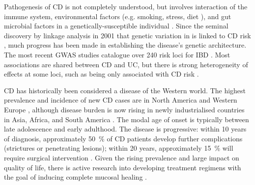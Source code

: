 Pathogenesis of \gls{CD} is not completely understood, but involves interaction of the immune system, environmental factors (e.g. smoking, stress, diet \autocite{ananthakrishnan2015EpidemiologyRiskFactors,roda2020CrohnDisease}), and gut microbial factors in a genetically-susceptible individual \autocite{desouza2016ImmunopathogenesisIBDCurrent}.
Since the seminal discovery by linkage analysis in 2001 that genetic variation in  is linked to \gls{CD} risk \autocite{todd2001TacklingCommonDisease},
much progress has been made in establishing the disease's genetic architecture.
The most recent \gls{GWAS} studies catalogue over 240 risk loci for \gls{IBD} \autocite{delange2017GenomewideAssociationStudy}.
Most associations are shared between \gls{CD} and \gls{UC}, but there is strong heterogeneity of effects at some loci, such as  being only associated with \gls{CD} risk \autocite{jostins2012HostMicrobeInteractions,liu2015AssociationAnalysesIdentify}.

\gls{CD} has historically been considered a disease of the Western world.
The highest prevalence and incidence of new \gls{CD} cases are in North America and Western Europe \autocite{roda2020CrohnDisease},
although disease burden is now rising in newly industrialised countries in Asia, Africa, and South America \autocite{kaplan2015GlobalBurdenIBD,alatab2020GlobalRegionalNational}.
The modal age of onset is typically between late adolescence and early adulthood.
The disease is progressive:
within 10 years of diagnosis, approximately \SI{50}{\percent} of \gls{CD} patients develop further complications (strictures or penetrating lesions); within 20 years, approximately \SI{15}{\percent} will require surgical intervention \autocite{roda2020CrohnDisease}.
Given the rising prevalence and large impact on quality of life, there is active research into developing treatment regimens with the goal of inducing complete mucosal healing \autocite{levin2016MechanismActionAntiTNF,roda2020CrohnDisease}.

